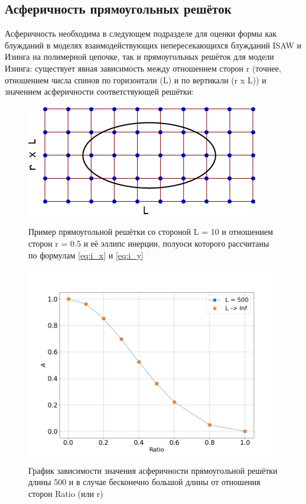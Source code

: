 \subsection{Асферичность прямоугольных решёток}

Асферичность необходима в следующем подразделе для оценки формы как блужданий в моделях взаимодействующих непересекающихся блужданий ISAW и Изинга на полимерной цепочке, так и прямоугольных решёток для модели Изинга: существует явная зависимость между отношением сторон r (точнее, отношением числа спинов по горизонтали (L) и по вертикали (r x L)) и значением асферичности соответствующей решётки:

\begin{figure}[h]
\begin{minipage}{0.45\textwidth}
     \includegraphics[width=\textwidth]{Sections/Images/RectanGrid.png}
    \caption{Пример прямоугольной решётки со стороной L = 10 и отношением сторон r = 0.5 и её эллипс инерции, полуоси которого рассчитаны по формулам \eqref{eq:i_x} и \eqref{eq:i_y}}
\end{minipage}
\hfill
\begin{minipage}{0.5\textwidth}
     \includegraphics[width=\textwidth]{Sections/Images/A_r.png}
    \caption{График зависимости значения асферичности прямоугольной решётки длины 500 и в случае бесконечно большой длины от отношения сторон Ratio (или r)}
    \label{fig:A_r}
\end{minipage}
   
\end{figure}


